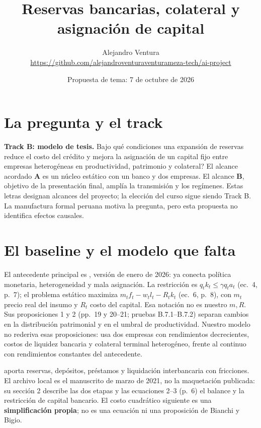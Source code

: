 \documentclass[11pt]{article}
\title{Reservas bancarias, colateral y asignaci\'on de capital}
\author{Alejandro Ventura \\ \small\url{https://github.com/alejandroventuraventurameza-tech/ai-project}}
\date{Propuesta de tema: 7 de octubre de 2026}
\begin{document}
\maketitle

\section{La pregunta y el track}
\textbf{Track B: modelo de tesis.} \textquestiondown Bajo qu\'e condiciones una
expansi\'on de reservas reduce el costo del cr\'edito y mejora la asignaci\'on de
un capital fijo entre empresas heterog\'eneas en productividad, patrimonio y
colateral? El alcance acordado \textbf{A} es un n\'ucleo est\'atico con un banco
y dos empresas. El alcance \textbf{B}, objetivo de la presentaci\'on final, ampl\'ia
la transmisi\'on y los reg\'imenes. Estas letras designan alcances del proyecto;
la elecci\'on del curso sigue siendo Track B. La manufactura formal peruana
motiva la pregunta, pero esta propuesta no identifica efectos causales.

\section{El baseline y el modelo que falta}
El antecedente principal es \citet{gonzalez2026}, versi\'on de enero de 2026:
ya conecta pol\'itica monetaria, heterogeneidad y mala asignaci\'on. La
restricci\'on es $q_t k_t\leq\gamma q_t a_t$ (ec.~4, p.~7); el problema est\'atico
maximiza $m_t f_t-w_t l_t-R_t k_t$ (ec.~6, p.~8), con $m_t$ precio real
del insumo y $R_t$ costo del capital. Esa notaci\'on no es nuestro $m,R$.
Sus proposiciones 1 y 2 (pp.~19 y 20--21; pruebas B.7.1--B.7.2) separan cambios
en la distribuci\'on patrimonial y en el umbral de productividad. Nuestro modelo
no rederiva esas proposiciones: usa dos empresas con rendimientos decrecientes,
costos de liquidez bancaria y colateral terminal heterog\'eneo, frente al
continuo con rendimientos constantes del antecedente.

\citet{bianchi2022} aporta reservas, dep\'ositos, pr\'estamos y liquidaci\'on
interbancaria con fricciones. El archivo local es el manuscrito de marzo de
2021, no la maquetaci\'on publicada: su secci\'on 2 describe las dos etapas y las
ecuaciones 2--3 (p.~6) el balance y la restricci\'on de capital bancario.
El costo cuadr\'atico siguiente es una \textbf{simplificaci\'on propia}; no es
una ecuaci\'on ni una proposici\'on de Bianchi y Bigio.
\end{document}

